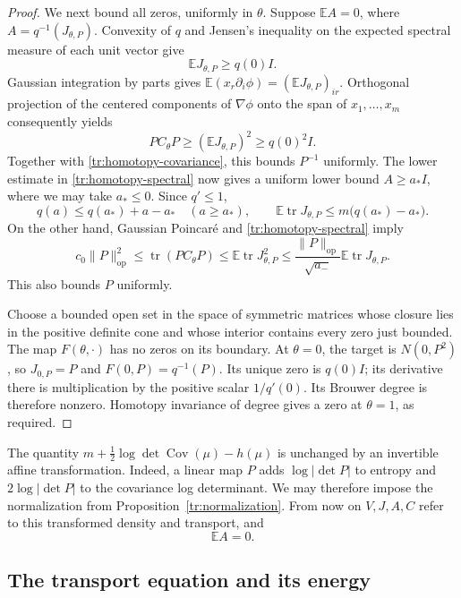 \begin{proof}
We next bound all zeros, uniformly in $\theta$.  Suppose
$\mathbb EA=0$, where $A=q^{-1}(J_{\theta,P})$.  Convexity of $q$
and Jensen's inequality on the expected spectral measure of each unit
vector give
\[
 \mathbb E J_{\theta,P}\ge q(0)I.
\]
Gaussian integration by parts gives
$\mathbb E(x_r\partial_i\phi)=(\mathbb E J_{\theta,P})_{ir}$.
Orthogonal projection of the centered components of $\nabla\phi$
onto the span of $x_1,\ldots,x_m$ consequently yields
\[
 P C_\theta P\ge(\mathbb E J_{\theta,P})^2\ge q(0)^2I.
\]
Together with \eqref{tr:homotopy-covariance}, this bounds $P^{-1}$
uniformly.  The lower estimate in \eqref{tr:homotopy-spectral} now
gives a uniform lower bound $A\ge a_*I$, where we may take $a_*\le0$.
Since $q'\le1$,
\[
 q(a)\le q(a_*)+a-a_*\quad(a\ge a_*),
 \qquad
 \mathbb E\operatorname{tr}J_{\theta,P}
 \le m\bigl(q(a_*)-a_*\bigr).
\]
On the other hand, Gaussian Poincar\'e and
\eqref{tr:homotopy-spectral} imply
\[
 c_0\|P\|_{\mathrm{op}}^2
 \le\operatorname{tr}(P C_\theta P)
 \le\mathbb E\operatorname{tr}J_{\theta,P}^2
 \le\frac{\|P\|_{\mathrm{op}}}{\sqrt{a_-}}
       \mathbb E\operatorname{tr}J_{\theta,P}.
\]
This also bounds $P$ uniformly.

Choose a bounded open set in the space of symmetric matrices whose
closure lies in the positive definite cone and whose interior contains
every zero just bounded.  The map $F(\theta,\cdot)$ has no zeros on its
boundary.  At $\theta=0$, the target is $N(0,P^2)$, so
$J_{0,P}=P$ and $F(0,P)=q^{-1}(P)$.  Its unique zero is $q(0)I$;
its derivative there is multiplication by the positive scalar
$1/q'(0)$.  Its Brouwer degree is therefore nonzero.  Homotopy
invariance of degree gives a zero at $\theta=1$, as required.
\end{proof}

The quantity
$m+\tfrac12\log\det\operatorname{Cov}(\mu)-h(\mu)$ is unchanged
by an invertible affine transformation.  Indeed, a linear map $P$
adds $\log|\det P|$ to entropy and $2\log|\det P|$ to the covariance
log determinant.  We may therefore impose the normalization from
Proposition~\ref{tr:normalization}.  From now on $V,J,A,C$ refer to
this transformed density and transport, and
\begin{equation}\label{tr:mean-zero}
 \mathbb EA=0.
\end{equation}

\subsection{The transport equation and its energy}

